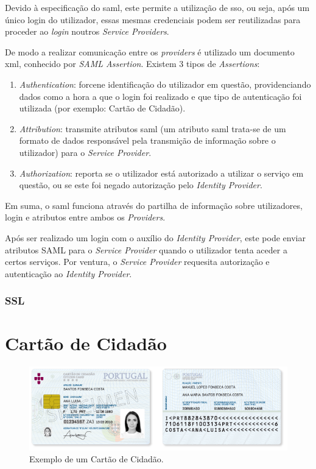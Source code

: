 Devido à especificação do \gls{saml}, este permite a utilização de \gls{sso}, ou seja, após um único login do utilizador, essas mesmas credenciais podem ser reutilizadas para proceder ao \emph{login} noutros \emph{Service Providers}.

De modo a realizar comunicação entre os \emph{providers} é utilizado um documento \gls{xml}, conhecido por \emph{SAML Assertion}. Existem 3 tipos de \emph{Assertions}:

\begin{enumerate}
    \item \emph{Authentication}: forcene identificação do utilizador em questão, providenciando dados como a hora a que o login foi realizado e que tipo de autenticação foi utilizada (por exemplo: Cartão de Cidadão).
    \item \emph{Attribution}: transmite atributos \gls{saml} (um atributo \gls{saml} trata-se de um formato de dados responsável pela transmição de informação sobre o utilizador) para o \emph{Service Provider}.
    \item \emph{Authorization}: reporta se o utilizador está autorizado a utilizar o serviço em questão, ou se este foi negado autorização pelo \emph{Identity Provider}.
\end{enumerate}

Em suma, o \gls{saml} funciona através do partilha de informação sobre utilizadores, login e atributos entre ambos os \emph{Providers}. 

Após ser realizado um login com o auxílio do \emph{Identity Provider}, este pode enviar atributos SAML para o \emph{Service Provider} quando o utilizador tenta aceder a certos serviços. Por ventura, o \emph{Service Provider} requesita autorização e autenticação ao \emph{Identity Provider}.

\newpage
\subsubsection{SSL} \label{ssl_section}

\newpage
\section{Cartão de Cidadão}

\begin{figure}[h]
    \centering
    \includegraphics[width=\textwidth]{img/cc/CartaoCidadao.png}
    \caption{Exemplo de um Cartão de Cidadão\cite{ccPic}.}
\end{figure}

